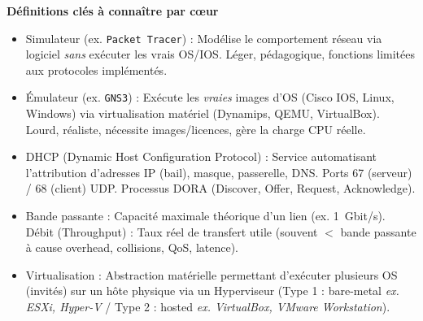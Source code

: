 \documentclass[11pt]{article}
\newcommand{\cle}[1]{{\popxbold\color{popdark}#1}}
\newcounter{popsec}
\newcounter{popsub}
\newcommand{\courssub}[1]{%
  \stepcounter{popsub}%
  \par\vspace{9pt}\noindent{\popxbold\fontsize{11.5}{13}\selectfont\color{popink}{\color{poporange}\thepopsec.\thepopsub}\hspace{6pt}#1}\par\nopagebreak\vspace{4pt}
}
\begin{document}
\courssub{Bilan de la leçon}
\begin{aretenir}

\textbf{Définitions clés à connaître par cœur}
\begin{itemize}
    \item \cle{Simulateur} (ex. \texttt{Packet Tracer}) : Modélise le comportement réseau via logiciel \emph{sans} exécuter les vrais OS/IOS. Léger, pédagogique, fonctions limitées aux protocoles implémentés.
    \item \cle{Émulateur} (ex. \texttt{GNS3}) : Exécute les \emph{vraies} images d'OS (Cisco IOS, Linux, Windows) via virtualisation matériel (Dynamips, QEMU, VirtualBox). Lourd, réaliste, nécessite images/licences, gère la charge CPU réelle.
    \item \cle{DHCP} (Dynamic Host Configuration Protocol) : Service automatisant l'attribution d'adresses IP (bail), masque, passerelle, DNS. Ports 67 (serveur) / 68 (client) UDP. Processus DORA (Discover, Offer, Request, Acknowledge).
    \item \cle{Bande passante} : Capacité maximale théorique d'un lien (ex. \SI{1}{Gbit/s}). \cle{Débit} (Throughput) : Taux réel de transfert utile (souvent $<$ bande passante à cause overhead, collisions, QoS, latence).
    \item \cle{Virtualisation} : Abstraction matérielle permettant d'exécuter plusieurs OS (invités) sur un hôte physique via un \cle{Hyperviseur} (Type 1 : bare-metal \emph{ex. ESXi, Hyper-V} / Type 2 : hosted \emph{ex. VirtualBox, VMware Workstation}).
\end{itemize}


\end{aretenir}
\end{document}
